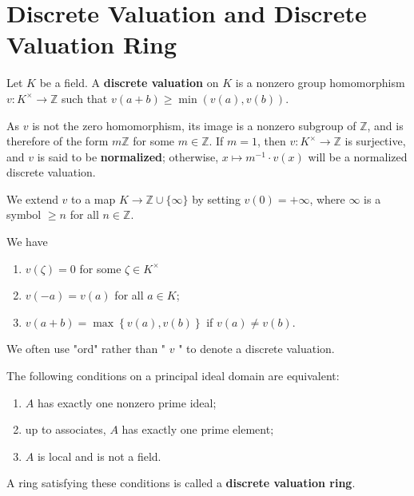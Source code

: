 \documentclass[12pt, oneside]{book}
\begin{document}
\section{Discrete Valuation and Discrete Valuation Ring}

\begin{definition}
    Let $K$ be a field.
    A \textbf{discrete valuation} on $K$ is a nonzero group homomorphism $v: K^{\times} \rightarrow \mathbb{Z}$ such that $v(a+b) \geq \min (v(a), v(b))$.

    As $v$ is not the zero homomorphism, its image is a nonzero subgroup of $\mathbb{Z}$, and is therefore of the form $m \mathbb{Z}$ for some $m \in \mathbb{Z}$. If $m=1$, then $v: K^{\times} \rightarrow \mathbb{Z}$ is surjective, and $v$ is said to be \textbf{normalized}; otherwise, $x \mapsto m^{-1} \cdot v(x)$ will be a normalized discrete valuation.

    We extend $v$ to a map $K \rightarrow \mathbb{Z} \cup\{\infty\}$ by setting $v(0)=+\infty$, where $\infty$ is a symbol $\geq n$ for all $n \in \mathbb{Z}$.
    \begin{remark}
        We have
        \begin{enumerate}
            \item $v(\zeta)=0$ for some $\zeta \in K^{\times}$
            \item $v(-a)=v(a)$ for all $a \in K$;
            \item $v(a+b) = \max \left\{v(a),v(b)\right\}$ if $v(a) \neq v(b)$.
        \end{enumerate}
        We often use "ord" rather than " $v$ " to denote a discrete valuation.
    \end{remark}
\end{definition}

\begin{definition}
    The following conditions on a principal ideal domain are equivalent:
    \begin{enumerate}
        \item  $A$ has exactly one nonzero prime ideal;
        \item up to associates, $A$ has exactly one prime element;
        \item  $A$ is local and is not a field.
    \end{enumerate}
    A ring satisfying these conditions is called a \textbf{discrete valuation ring}.
\end{definition}
\end{document}
